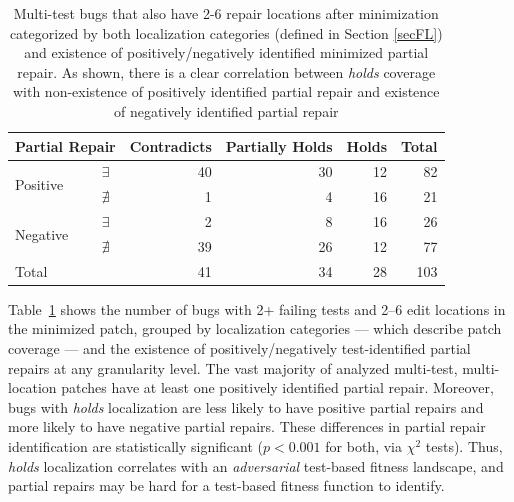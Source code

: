 \documentclass[10pt, conference]{IEEEtran}
\begin{document}
\begin{table}
  {\begin{center}
      \begin{tabular} {llrrrr}
        \toprule
        \multicolumn{2}{c}{Partial Repair} & Contradicts & Partially Holds & Holds & Total \\
        \midrule
        \multirow{2}{*}{Positive} & $\exists$  & 40 & 30 & 12 &  82 \\
                                  & $\nexists$ &  1 &  4 & 16 &  21 \\
        \midrule
        \multirow{2}{*}{Negative} & $\exists$  &  2 &  8 & 16 &  26 \\
                                  & $\nexists$ & 39 & 26 & 12 &  77 \\
        \midrule
        Total                     &            & 41 & 34 & 28 & 103 \\
        \bottomrule
      \end{tabular}
    \end{center}
  }
  \caption{Multi-test bugs that also have 2-6 repair locations after minimization categorized by both localization categories (defined in Section \ref{secFL}) and existence of positively/negatively identified minimized partial repair. As shown, there is a clear correlation between \emph{holds} coverage with non-existence of positively identified partial repair and existence of negatively identified partial repair}
  \label{tab:cov_fitness}
\end{table}
 
Table~\ref{tab:cov_fitness} shows the number of bugs with 2+ failing tests
and 2--6 edit locations in the minimized patch, grouped by localization categories 
--- which describe patch coverage --- and the existence of positively/negatively
test-identified partial repairs at any granularity level.
The vast majority of analyzed multi-test, multi-location patches have at least
one positively identified partial repair.
Moreover, bugs with \emph{holds} localization are less likely to have
positive partial repairs and more likely to have negative partial repairs.
These differences in partial repair identification are statistically significant 
($p < 0.001$ for both, via $\chi^2$ tests).
Thus, \emph{holds} localization correlates with an
\emph{adversarial} test-based fitness landscape,
and partial repairs may be hard for a test-based
fitness function to identify.
\end{document}
